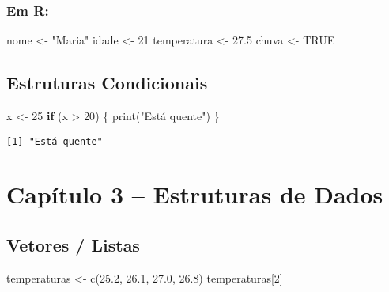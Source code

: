 \documentclass[
  letterpaper,
  DIV=11,
  numbers=noendperiod]{scrreprt}
\newenvironment{Shaded}{\begin{snugshade}}{\end{snugshade}}
\newcommand{\ConstantTok}[1]{\textcolor[rgb]{0.56,0.35,0.01}{#1}}
\newcommand{\ControlFlowTok}[1]{\textcolor[rgb]{0.00,0.23,0.31}{\textbf{#1}}}
\newcommand{\DecValTok}[1]{\textcolor[rgb]{0.68,0.00,0.00}{#1}}
\newcommand{\FloatTok}[1]{\textcolor[rgb]{0.68,0.00,0.00}{#1}}
\newcommand{\FunctionTok}[1]{\textcolor[rgb]{0.28,0.35,0.67}{#1}}
\newcommand{\NormalTok}[1]{\textcolor[rgb]{0.00,0.23,0.31}{#1}}
\newcommand{\OtherTok}[1]{\textcolor[rgb]{0.00,0.23,0.31}{#1}}
\newcommand{\SpecialCharTok}[1]{\textcolor[rgb]{0.37,0.37,0.37}{#1}}
\newcommand{\StringTok}[1]{\textcolor[rgb]{0.13,0.47,0.30}{#1}}
\begin{document}
\subsection{Em R:}\label{em-r}

\begin{Shaded}
\begin{Highlighting}[]
\NormalTok{nome }\OtherTok{\textless{}{-}} \StringTok{"Maria"}
\NormalTok{idade }\OtherTok{\textless{}{-}} \DecValTok{21}
\NormalTok{temperatura }\OtherTok{\textless{}{-}} \FloatTok{27.5}
\NormalTok{chuva }\OtherTok{\textless{}{-}} \ConstantTok{TRUE}
\end{Highlighting}
\end{Shaded}

\section{Estruturas Condicionais}\label{estruturas-condicionais}

\begin{Shaded}
\begin{Highlighting}[]
\NormalTok{x }\OtherTok{\textless{}{-}} \DecValTok{25}
\ControlFlowTok{if}\NormalTok{ (x }\SpecialCharTok{\textgreater{}} \DecValTok{20}\NormalTok{) \{}
  \FunctionTok{print}\NormalTok{(}\StringTok{"Está quente"}\NormalTok{)}
\NormalTok{\}}
\end{Highlighting}
\end{Shaded}

\begin{verbatim}
[1] "Está quente"
\end{verbatim}


\chapter{Capítulo 3 -- Estruturas de
Dados}\label{capuxedtulo-3-estruturas-de-dados}

\section{Vetores / Listas}\label{vetores-listas}

\begin{Shaded}
\begin{Highlighting}[]
\NormalTok{temperaturas }\OtherTok{\textless{}{-}} \FunctionTok{c}\NormalTok{(}\FloatTok{25.2}\NormalTok{, }\FloatTok{26.1}\NormalTok{, }\FloatTok{27.0}\NormalTok{, }\FloatTok{26.8}\NormalTok{)}
\NormalTok{temperaturas[}\DecValTok{2}\NormalTok{]}
\end{Highlighting}
\end{Shaded}
\end{document}
